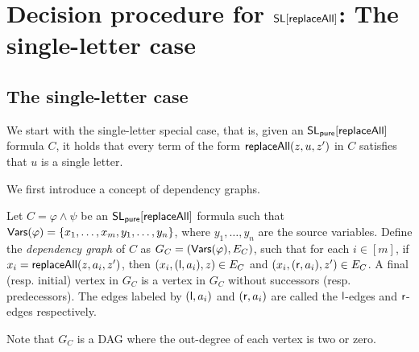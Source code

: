 

\section{Decision procedure for $\mathsf{SL}[\mathsf{replaceAll}]$: The single-letter case} \label{sec:replaceallsl}


\subsection{The single-letter case}

We start with the single-letter special case, that is, given an $\mathsf{SL_{pure}}[\mathsf{replaceAll}]$ formula $C$, it holds that every term of the form $\mathsf{replaceAll}(z, u, z')$ in $C$ satisfies that $u$ is a single letter.

We first introduce a concept of dependency graphs.

\begin{definition}
	Let $C= \varphi \wedge \psi$ be an $\mathsf{SL_{pure}}[\mathsf{replaceAll}]$ formula such that $\mathsf{Vars}(\varphi) = \{x_1,\dots, x_m, y_1, \dots, y_n\}$, where $y_1,\dots, y_n$ are the source variables. Define the \emph{dependency graph} of $C$ as $G_C= (\mathsf{Vars}(\varphi), E_C)$, such that for each $i \in [m]$, if $x_i = \mathsf{replaceAll}(z, a_i, z')$, then $(x_i, (\mathsf{l}, a_i), z) \in E_C$ and $(x_i, (\mathsf{r}, a_i), z') \in E_C$. A final (resp. initial) vertex in $G_C$ is a vertex in $G_C$ without successors (resp. predecessors). The edges labeled by $(\mathsf{l},a_i)$ and $(\mathsf{r}, a_i)$ are called the $\mathsf{l}$-edges and $\mathsf{r}$-edges respectively. 
\end{definition}
Note that $G_C$ is a DAG where the out-degree of each vertex is two or zero. 


